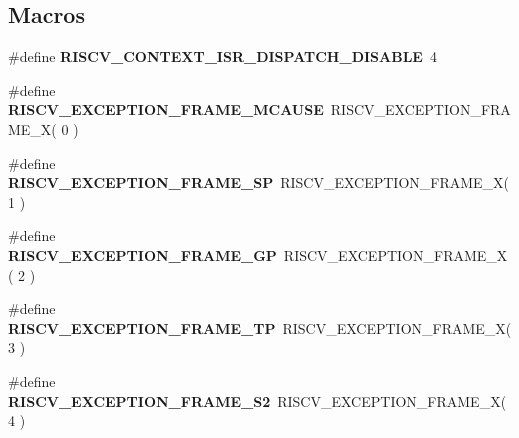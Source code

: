 \subsection*{Macros}
\begin{DoxyCompactItemize}
\item 
\mbox{\label{group__RTEMSScoreCPURISCV_gaea93735f5b17dde31c638e5773709b0d}} 
\#define {\bfseries R\+I\+S\+C\+V\+\_\+\+C\+O\+N\+T\+E\+X\+T\+\_\+\+I\+S\+R\+\_\+\+D\+I\+S\+P\+A\+T\+C\+H\+\_\+\+D\+I\+S\+A\+B\+LE}~4
\item 
\mbox{\label{group__RTEMSScoreCPURISCV_gaf315e7c4c319cc7bf9a37ad33d00681e}} 
\#define {\bfseries R\+I\+S\+C\+V\+\_\+\+E\+X\+C\+E\+P\+T\+I\+O\+N\+\_\+\+F\+R\+A\+M\+E\+\_\+\+M\+C\+A\+U\+SE}~R\+I\+S\+C\+V\+\_\+\+E\+X\+C\+E\+P\+T\+I\+O\+N\+\_\+\+F\+R\+A\+M\+E\+\_\+X( 0 )
\item 
\mbox{\label{group__RTEMSScoreCPURISCV_ga11e7251d68d3455a33bc5d73c4b3e82c}} 
\#define {\bfseries R\+I\+S\+C\+V\+\_\+\+E\+X\+C\+E\+P\+T\+I\+O\+N\+\_\+\+F\+R\+A\+M\+E\+\_\+\+SP}~R\+I\+S\+C\+V\+\_\+\+E\+X\+C\+E\+P\+T\+I\+O\+N\+\_\+\+F\+R\+A\+M\+E\+\_\+X( 1 )
\item 
\mbox{\label{group__RTEMSScoreCPURISCV_gafa007715cf2d9c3d82fba8371b56cc83}} 
\#define {\bfseries R\+I\+S\+C\+V\+\_\+\+E\+X\+C\+E\+P\+T\+I\+O\+N\+\_\+\+F\+R\+A\+M\+E\+\_\+\+GP}~R\+I\+S\+C\+V\+\_\+\+E\+X\+C\+E\+P\+T\+I\+O\+N\+\_\+\+F\+R\+A\+M\+E\+\_\+X( 2 )
\item 
\mbox{\label{group__RTEMSScoreCPURISCV_gab32c7e75fe9fb11abf3086e3e8a3c2fc}} 
\#define {\bfseries R\+I\+S\+C\+V\+\_\+\+E\+X\+C\+E\+P\+T\+I\+O\+N\+\_\+\+F\+R\+A\+M\+E\+\_\+\+TP}~R\+I\+S\+C\+V\+\_\+\+E\+X\+C\+E\+P\+T\+I\+O\+N\+\_\+\+F\+R\+A\+M\+E\+\_\+X( 3 )
\item 
\mbox{\label{group__RTEMSScoreCPURISCV_ga8d138c034db9becea5ebc940ca291206}} 
\#define {\bfseries R\+I\+S\+C\+V\+\_\+\+E\+X\+C\+E\+P\+T\+I\+O\+N\+\_\+\+F\+R\+A\+M\+E\+\_\+\+S2}~R\+I\+S\+C\+V\+\_\+\+E\+X\+C\+E\+P\+T\+I\+O\+N\+\_\+\+F\+R\+A\+M\+E\+\_\+X( 4 )
\item 
\mbox{\label{group__RTEMSScoreCPURISCV_gad8b6430c2887fc72faa7ac59f847f262}} 

\end{DoxyCompactItemize}
